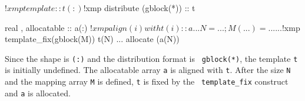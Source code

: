 \begin{XFexample}
!$xmp template :: t(:)
!$xmp distribute (gblock(*)) :: t

      real , allocatable :: a(:)
!$xmp align (i) with t(i) :: a
      ...
      N = ...; M(...) = ...
      ...
!$xmp template_fix(gblock(M)) t(N)
      ...
      allocate (a(N))
\end{XFexample}

Since the shape is {\tt (:)} and the distribution format is {\tt
gblock(*)}, 
the template {\tt t} is initially undefined. The allocatable array
{\tt a} is aligned with {\tt t}. After the size {\tt N} and the
mapping array {\tt M} is defined, {\tt t} is fixed by the {\tt
  template\_fix} construct and {\tt a} is allocated.


